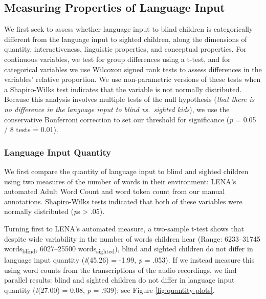 \documentclass[
  man,floatsintext]{apa6}
\begin{document}
\hypertarget{measuring-properties-of-language-input}{%
\subsection{Measuring Properties of Language Input}\label{measuring-properties-of-language-input}}

We first seek to assess whether language input to blind children is categorically different from the language input to sighted children, along the dimensions of quantity, interactiveness, linguistic properties, and conceptual properties. For continuous variables, we test for group differences using a t-test, and for categorical variables we use Wilcoxon signed rank tests to assess differences in the variables' relative proportion. We use non-parametric versions of these tests when a Shapiro-Wilks test indicates that the variable is not normally distributed. Because this analysis involves multiple tests of the null hypothesis (\emph{that there is no difference in the language input to blind vs.~sighted kids}), we use the conservative Bonferroni correction to set our threshold for significance (\emph{p} = 0.05 / 8 tests = 0.01).

\hypertarget{language-input-quantity}{%
\subsubsection{Language Input Quantity}\label{language-input-quantity}}

We first compare the quantity of language input to blind and sighted children using two measures of the number of words in their environment: LENA's automated Adult Word Count and word token count from our manual annotations. Shapiro-Wilks tests indicated that both of these variables were normally distributed (\emph{p}s \textgreater{} .05).

Turning first to LENA's automated measure, a two-sample t-test shows that despite wide variability in the number of words children hear (Range: 6233--31745 words\textsubscript{blind}, 6027--25500 words\textsubscript{sighted}), blind and sighted children do not differ in language input quantity (\emph{t}(45.26) = -1.99, \emph{p} = .053). If we instead measure this using word counts from the transcriptions of the audio recordings, we find parallel results: blind and sighted children do not differ in language input quantity (\emph{t}(27.00) = 0.08, \emph{p} = .939); see Figure \ref{fig:quantity-plots}.
\end{document}
